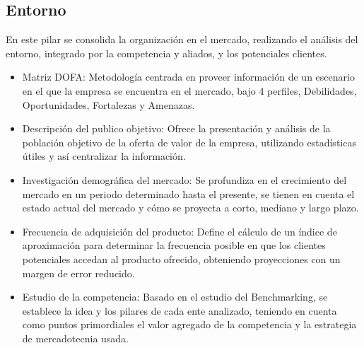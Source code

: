 \subsection{Entorno}

En este pilar se consolida la organización en el mercado, realizando el análisis del entorno, integrado por la competencia y aliados, y los potenciales clientes.

\begin{itemize}
    \item Matriz DOFA: Metodología centrada en proveer información de un escenario en el que la empresa se encuentra en el mercado, bajo 4 perfiles, Debilidades, Oportunidades, Fortalezas y Amenazas.
    \item Descripción del publico objetivo: Ofrece la presentación y análisis de la población objetivo de la oferta de valor de la empresa, utilizando estadísticas útiles y así centralizar la información.
    \item Investigación demográfica del mercado: Se profundiza en el crecimiento del mercado en un periodo determinado hasta el presente, se tienen en cuenta el estado actual del mercado y cómo se proyecta a corto, mediano y largo plazo.
    \item Frecuencia de adquisición del producto: Define el cálculo de un índice de aproximación para determinar la frecuencia posible en que los clientes potenciales accedan al producto ofrecido, obteniendo proyecciones con un margen de error reducido.
    \item Estudio de la competencia: Basado en el estudio del Benchmarking, se establece la idea y los pilares de cada ente analizado, teniendo en cuenta como puntos primordiales el valor agregado de la competencia y la estrategia de mercadotecnia usada.
\end{itemize}